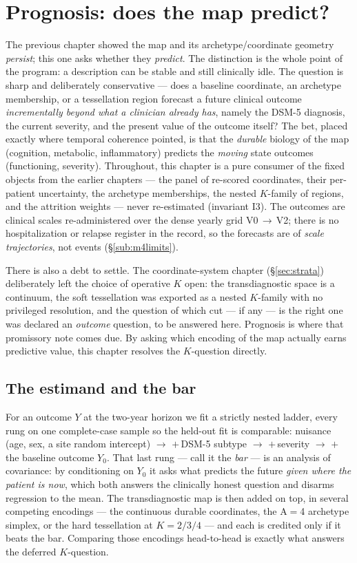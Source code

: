 \section{Prognosis: does the map predict?}
\label{sec:prognosis}

The previous chapter showed the map and its archetype/coordinate geometry \emph{persist}; this one asks whether they
\emph{predict}. The distinction is the whole point of the program: a description can be stable and still
clinically idle. The question is sharp and deliberately conservative --- does a baseline coordinate, an
archetype membership, or a tessellation region forecast a future clinical outcome \emph{incrementally
beyond what a clinician already has}, namely the DSM-5 diagnosis, the current severity, and the present
value of the outcome itself? The bet, placed exactly where temporal coherence pointed, is that the
\emph{durable} biology of the map (cognition, metabolic, inflammatory) predicts the \emph{moving} state
outcomes (functioning, severity). Throughout, this chapter is a pure consumer of the fixed objects from the
earlier chapters --- the panel of re-scored coordinates, their per-patient uncertainty, the archetype
memberships, the nested $K$-family of regions, and the attrition weights --- never re-estimated
(invariant I3). The outcomes are clinical scales re-administered over the dense yearly grid
V0\,$\to$\,V2; there is no hospitalization or relapse register in the record, so the forecasts are of
\emph{scale trajectories}, not events (\S\ref{sub:m4limits}).

There is also a debt to settle. The coordinate-system chapter (\S\ref{sec:strata}) deliberately left the choice of
operative $K$ open: the transdiagnostic space is a continuum, the soft tessellation was exported as a
nested $K$-family with no privileged resolution, and the question of which cut --- if any --- is the right
one was declared an \emph{outcome} question, to be answered here. Prognosis is where that promissory note
comes due. By asking which encoding of the map actually earns predictive value, this chapter resolves the
$K$-question directly.

\subsection{The estimand and the bar}
For an outcome $Y$ at the two-year horizon we fit a strictly nested ladder, every rung on one
complete-case sample so the held-out fit is comparable: nuisance (age, sex, a site random intercept)
$\to$ {}$+$\,DSM-5 subtype $\to$ {}$+$\,severity $\to$ {}$+$\,the baseline outcome $Y_0$. That last
rung --- call it the \emph{bar} --- is an analysis of covariance: by conditioning on $Y_0$ it asks what
predicts the future \emph{given where the patient is now}, which both answers the clinically honest
question and disarms regression to the mean. The transdiagnostic map is then added on top, in several
competing encodings --- the continuous durable coordinates, the A$=$4 archetype simplex, or the hard
tessellation at $K=2/3/4$ --- and each is credited only if it beats the bar. Comparing those encodings
head-to-head is exactly what answers the deferred $K$-question.

